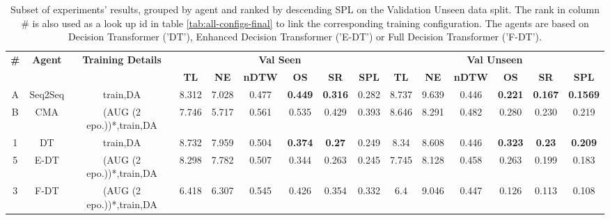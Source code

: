 \begin{table}
\centering
\caption{\label{tab:best_unseen_50}Subset of experiments' results, grouped by agent and ranked by descending SPL on the Validation Unseen data split. The rank in column \# is also used as a look up id in table \ref{tab:all-configs-final} to link the corresponding training configuration.     \newline The agents are based on Decision Transformer ('DT'), Enhanced Decision Transformer ('E-DT') or Full Decision Transformer ('F-DT').}
\begin{tabular}{@{\hskip3pt}c@{\hskip3pt}c@{\hskip3pt}c@{\hskip3pt}c@{\hskip3pt}c@{\hskip3pt}c@{\hskip3pt}c@{\hskip3pt}c@{\hskip3pt}c@{\hskip3pt}c@{\hskip3pt}c@{\hskip3pt}c@{\hskip3pt}c@{\hskip3pt}c@{\hskip3pt}c}
\toprule
\textbf{\#} & \textbf{Agent} & \textbf{Training Details} & \multicolumn{6}{c}{\textbf{Val Seen}} & \multicolumn{6}{c}{\textbf{Val Unseen}} \\
 \textbf{~} &     \textbf{~} &                \textbf{~} &       \textbf{TL} &    \textbf{NE} &   \textbf{nDTW} &     \textbf{OS} &    \textbf{SR} &    \textbf{SPL} &         \textbf{TL} &     \textbf{NE} &   \textbf{nDTW} &     \textbf{OS} &    \textbf{SR} &    \textbf{SPL} \\
          A &             Seq2Seq &                  train,DA &             8.312 &          7.028 &           0.477 &  \textbf{0.449} &  \textbf{0.316} &           0.282 &                8.737 &           9.639 &           0.446 &  \textbf{0.221} &  \textbf{0.167} &  \textbf{0.1569} \\
          B &           CMA &  (AUG (2 epo.))*,train,DA &             7.746 &          5.717 &           0.561 &           0.535 &          0.429 &           0.393 &               8.646 &           8.291 &           0.482 &           0.280 &          0.230 &           0.219 \\
\midrule
          1 &             DT &                  train,DA &             8.732 &          7.959 &           0.504 &  \textbf{0.374} &  \textbf{0.27} &           0.249 &                8.34 &           8.608 &           0.446 &  \textbf{0.323} &  \textbf{0.23} &  \textbf{0.209} \\
          5 &           E-DT &  (AUG (2 epo.))*,train,DA &             8.298 &          7.782 &           0.507 &           0.344 &          0.263 &           0.245 &               7.745 &           8.128 &           0.458 &           0.263 &          0.199 &           0.183 \\
          3 &           F-DT &  (AUG (2 epo.))*,train,DA &              6.418 &  6.307 &  0.545 &           0.426 &          0.354 &  0.332 &                 6.4 &  9.046 &  0.447 &           0.126 &          0.113 &           0.108 \\
\bottomrule
\end{tabular}
\end{table}
